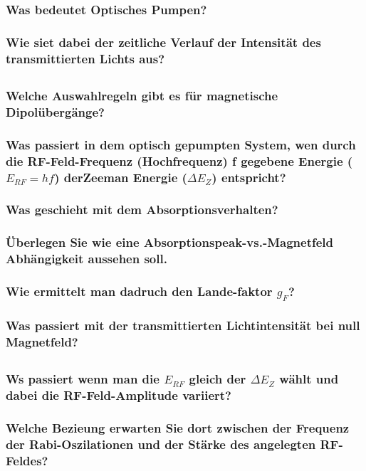 \subsubsection[]{Was bedeutet Optisches Pumpen?}
\subsubsection[]{Wie siet dabei der zeitliche Verlauf der Intensität des transmittierten Lichts aus?}

\subsection{}
\subsubsection[]{Welche Auswahlregeln gibt es für magnetische Dipolübergänge?}
\subsubsection[]{Was passiert in dem optisch gepumpten System, wen durch die RF-Feld-Frequenz (Hochfrequenz) f gegebene Energie ($E_{RF}=hf$) derZeeman Energie ($\Delta E_Z$) entspricht?}
\subsubsection[]{Was geschieht mit dem Absorptionsverhalten?}
\subsubsection[]{Überlegen Sie wie eine Absorptionspeak-vs.-Magnetfeld Abhängigkeit aussehen soll.}
\subsubsection[]{Wie ermittelt man dadruch den Lande-faktor $g_F$?}
\subsubsection[]{Was passiert mit der transmittierten Lichtintensität bei null Magnetfeld?}

\subsection{}
\subsubsection[]{Ws passiert wenn man die $E_{RF}$ gleich der $\Delta E_Z$ wählt und dabei die RF-Feld-Amplitude variiert?}
\subsubsection[]{Welche Bezieung erwarten Sie dort zwischen der Frequenz der Rabi-Oszilationen und der Stärke des angelegten RF-Feldes?}
